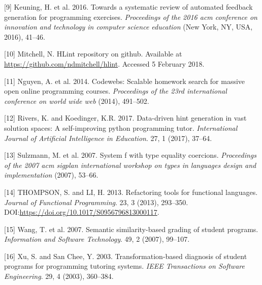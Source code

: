 \documentclass[a4paperpaper,]{report}
\begin{document}
\leavevmode\hypertarget{ref-2016feedbackreview}{}%
{[}9{]} Keuning, H. et al. 2016. Towards a systematic review of
automated feedback generation for programming exercises.
\emph{Proceedings of the 2016 acm conference on innovation and
technology in computer science education} (New York, NY, USA, 2016),
41--46.

\leavevmode\hypertarget{ref-HLint}{}%
{[}10{]} Mitchell, N. HLint repository on github. Available at
\url{https://github.com/ndmitchell/hlint}. Accessed 5 February 2018.

\leavevmode\hypertarget{ref-2014codewebs}{}%
{[}11{]} Nguyen, A. et al. 2014. Codewebs: Scalable homework search for
massive open online programming courses. \emph{Proceedings of the 23rd
international conference on world wide web} (2014), 491--502.

\leavevmode\hypertarget{ref-2017ITAP}{}%
{[}12{]} Rivers, K. and Koedinger, K.R. 2017. Data-driven hint
generation in vast solution spaces: A self-improving python programming
tutor. \emph{International Journal of Artificial Intelligence in
Education}. 27, 1 (2017), 37--64.

\leavevmode\hypertarget{ref-2007systemfc}{}%
{[}13{]} Sulzmann, M. et al. 2007. System f with type equality
coercions. \emph{Proceedings of the 2007 acm sigplan international
workshop on types in languages design and implementation} (2007),
53--66.

\leavevmode\hypertarget{ref-2013thompson}{}%
{[}14{]} THOMPSON, S. and LI, H. 2013. Refactoring tools for functional
languages. \emph{Journal of Functional Programming}. 23, 3 (2013),
293--350. DOI:\url{https://doi.org/10.1017/S0956796813000117}.

\leavevmode\hypertarget{ref-2007wang}{}%
{[}15{]} Wang, T. et al. 2007. Semantic similarity-based grading of
student programs. \emph{Information and Software Technology}. 49, 2
(2007), 99--107.

\leavevmode\hypertarget{ref-2003transformation}{}%
{[}16{]} Xu, S. and San Chee, Y. 2003. Transformation-based diagnosis of
student programs for programming tutoring systems. \emph{IEEE
Transactions on Software Engineering}. 29, 4 (2003), 360--384.
\end{document}
